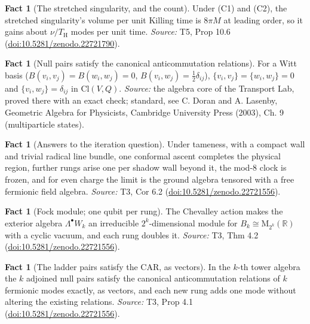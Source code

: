 \documentclass[11pt]{article}
\theoremstyle{definition}
\newtheorem{fact}[theorem]{Fact}
\theoremstyle{plain}
\providecommand{\Cl}{}\renewcommand{\Cl}{\mathrm{Cl}}
\providecommand{\Mat}{}\renewcommand{\Mat}{\mathrm{M}}
\providecommand{\R}{}\renewcommand{\R}{\mathbb{R}}
\providecommand{\TH}{}\renewcommand{\TH}{T_{\mathrm{H}}}
\begin{document}
\begin{fact}[The stretched singularity, and the count]\label{c:singularity.stretched-singularity-count}
Under (C1) and (C2), the stretched singularity's volume per unit Killing time is $8\pi M$ at leading order, so it gains about $\nu/\TH$ modes per unit time.
\emph{Source:} T5, Prop 10.6 (\href{https://doi.org/10.5281/zenodo.22721790}{doi:10.5281/zenodo.22721790}).
\end{fact}

\begin{fact}[Null pairs satisfy the canonical anticommutation relations]\label{c:std-algebra.witt-basis-car}
For a Witt basis ($B(v_i,v_j) = B(w_i,w_j) = 0$, $B(v_i,w_j) = \tfrac12\delta_{ij}$), $\{v_i,v_j\} = \{w_i,w_j\} = 0$ and $\{v_i,w_j\} = \delta_{ij}$ in $\Cl(V,Q)$.
\emph{Source:} the algebra core of the Transport Lab, proved there with an exact check; standard, see C. Doran and A. Lasenby, Geometric Algebra for Physicists, Cambridge University Press (2003), Ch. 9 (multiparticle states).
\end{fact}

\begin{fact}[Answers to the iteration question]\label{c:tower.answers-iteration-question}
Under tameness, with a compact wall and trivial radical line bundle, one conformal ascent completes the physical region, further rungs arise one per shadow wall beyond it, the mod-8 clock is frozen, and for even charge the limit is the ground algebra tensored with a free fermionic field algebra.
\emph{Source:} T3, Cor 6.2 (\href{https://doi.org/10.5281/zenodo.22721556}{doi:10.5281/zenodo.22721556}).
\end{fact}

\begin{fact}[Fock module; one qubit per rung]\label{c:tower.fock-module-one-qubit-per-rung}
The Chevalley action makes the exterior algebra $\Lambda^\bullet W_k$ an irreducible $2^k$-dimensional module for $B_k \cong \Mat_{2^k}(\R)$ with a cyclic vacuum, and each rung doubles it.
\emph{Source:} T3, Thm 4.2 (\href{https://doi.org/10.5281/zenodo.22721556}{doi:10.5281/zenodo.22721556}).
\end{fact}

\begin{fact}[The ladder pairs satisfy the CAR, as vectors]\label{c:tower.ladder-pairs-satisfy-car-vectors}
In the $k$-th tower algebra the $k$ adjoined null pairs satisfy the canonical anticommutation relations of $k$ fermionic modes exactly, as vectors, and each new rung adds one mode without altering the existing relations.
\emph{Source:} T3, Prop 4.1 (\href{https://doi.org/10.5281/zenodo.22721556}{doi:10.5281/zenodo.22721556}).
\end{fact}
\end{document}
